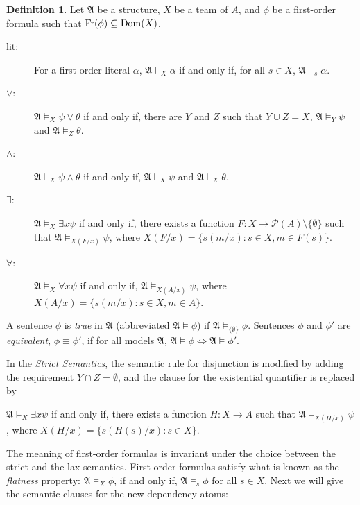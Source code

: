 \documentclass{article}
\theoremstyle{plain}
\theoremstyle{definition}
\newtheorem{definition}[theorem]{Definition}
\newcommand{\mA}{{\mathfrak A}}
\newcommand{\Dom}{{\rm Dom}}
\newcommand{\Fr}{{\rm Fr}}
\begin{document}
\begin{definition}
Let $\mA$ be a structure, $X$ be a team of $A$, and $\phi$ be a first-order formula such that $\Fr(\phi)\subseteq \Dom(X)$. \begin{description}
\item[lit:] For a first-order literal $\alpha$, $\mA \models_X \alpha$ if and only if, for all $s \in X$, $\mA \models_s \alpha$.
\item[$\vee$:]  $\mA \models_X \psi \vee \theta$ if and only if,  there are $Y$ and $Z$ such that $Y \cup Z=X$,  $\mA \models_Y \psi$ and $\mA \models_Z \theta$.
\item[$\wedge$:] $\mA \models_X \psi \wedge \theta$ if and only if, $\mA \models_X \psi$ and $\mA \models_X \theta$.
\item[$\exists$:]  $\mA \models_X \exists x \psi$ if and only if, there exists a function $F : X \rightarrow \mathcal{P}(A)\setminus \{\emptyset\}$ such that $\mA \models_{X(F/x)} \psi$, where $X(F/x) =  \{s(m/x) : s \in X, m \in F(s)\}$.
\item[$\forall$:] $\mA \models_X \forall x \psi$ if and only if, $\mA \models_{X(A/x)} \psi$, where $X(A/x) = \{s(m/x) : s \in X, m \in A\}$.
\end{description}
A sentence $\phi$ is  \emph{true} in $\mA$ (abbreviated $\mA \models \phi$) if $\mA \models_{\{\emptyset\}} \phi$. Sentences $\phi$ and $\phi'$ are  \emph{equivalent}, $\phi \equiv \phi'$, if for all models $\mA$, $\mA \models \phi \Leftrightarrow \mA \models \phi'$.
\end{definition}
In the \emph{Strict Semantics}, the semantic rule for disjunction is modified by adding the requirement $Y\cap Z = \emptyset$, and  the clause for the existential quantifier  is replaced by 
\begin{description} 
\item $\mA \models_X \exists x \psi$ if and only if, there exists a function $H : X \rightarrow A$ such that $\mA \models_{X(H/x)} \psi$, where $X(H/x) = \{s(H(s)/x) : s \in X\}$. \end{description}
The meaning of first-order formulas is invariant under the choice between the strict and the lax semantics. 
First-order formulas satisfy what is known as the \emph{flatness} property:
$\mA \models_X \phi$, if and only if,  $\mA \models_s \phi$  for all $s \in X$.
Next we will give the semantic clauses for the new dependency atoms:
\end{document}
